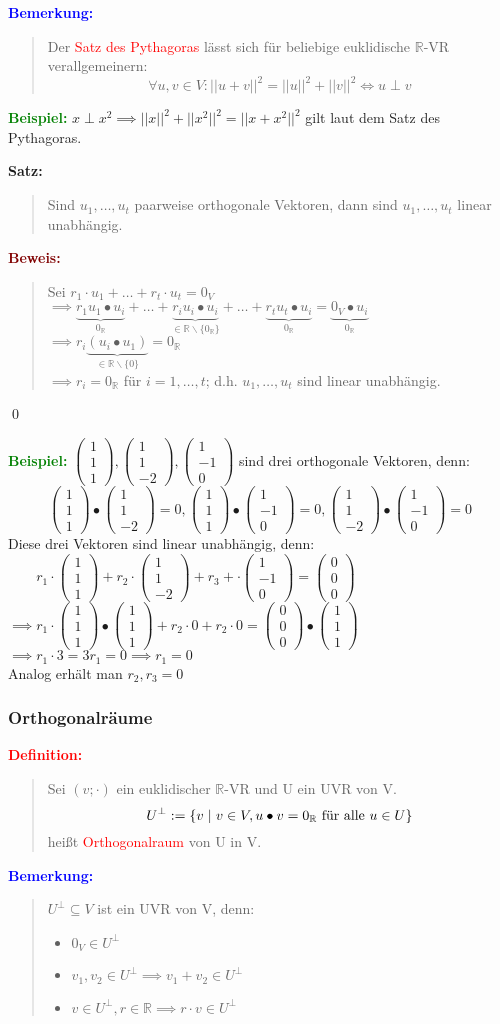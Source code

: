 \documentclass{article}
\newcommand{\smsp}{\phantom{\hspace{3px}}}
\newcommand{\red}[1]{\textcolor{red}{#1}}
\newcommand{\blue}[1]{\textcolor{blue}{#1}}
\newcommand{\green}[1]{\textcolor{green}{#1}}
\newcommand{\dgr}[1]{\textcolor{dgr}{#1}}
\newcommand{\maroon}[1]{\textcolor{maroon}{#1}}
\newcommand{\ex}{\green{\textbf{Beispiel: }}}
\newcommand{\de}[1]{\red{\textbf{Definition: }}\begin{quote}#1\end{quote}}
\newcommand{\an}[1]{\blue{\textbf{Bemerkung: }}\begin{quote}#1\end{quote}}
\newcommand{\se}[1]{\dgr{\textbf{Satz: }}\begin{quote}#1\end{quote}}
\newcommand{\pr}[1]{\maroon{\textbf{Beweis: }}\begin{quote}#1\end{quote}\qed}
\newcommand{\R}{\mathbb{R}}
\renewcommand{\st}{\smsp | \smsp}
\newcommand{\no}[1]{||#1||}
\newcommand{\vvvec}[3]{\begin{pmatrix}#1\\#2\\#3\end{pmatrix}}
\begin{document}
\an{
    Der \red{Satz des Pythagoras} lässt sich für beliebige euklidische $\R$-VR verallgemeinern:
    \[
        \forall u,v \in V: \no{u + v}^2 = \no{u}^2 + \no{v}^2 \iff u \perp v
    \]
}

\ex $x \perp x^2 \implies \no{x}^2 + \no{x^2}^2 = \no{x + x^2}^2$ gilt laut dem Satz des Pythagoras.

\se{
    Sind $u_1, \dots, u_t$ paarweise orthogonale Vektoren, dann sind $u_1, \dots, u_t$ linear unabhängig.
}
\pr{
    Sei $r_1 \cdot u_1 + \dots + r_t \cdot u_t = 0_V$\\
    $\implies \underbrace{r_1u_1 \bullet u_i}_{0_{\R}} + \dots + \underbrace{r_iu_i \bullet u_i}_{\in \R \backslash \{0_{\R}\}} + \dots + \underbrace{r_tu_t \bullet u_i}_{0_{\R}} = \underbrace{0_V \bullet u_i}_{0_{\R}}$\\
    $\implies r_i \underbrace{(u_i \bullet u_1)}_{\in \R \backslash \{0\}} = 0_{\R}$\\
    $\implies r_i = 0_{\R}$ für $i = 1, \dots, t$; d.h. $u_1, \dots, u_t$ sind linear unabhängig.
}

\newpage
\ex $\vvvec{1}{1}{1}, \vvvec{1}{1}{-2}, \vvvec{1}{-1}{0}$ sind drei orthogonale Vektoren, denn:
\[
    \vvvec{1}{1}{1} \bullet \vvvec{1}{1}{-2} = 0, \vvvec{1}{1}{1} \bullet \vvvec{1}{-1}{0} = 0, \vvvec{1}{1}{-2} \bullet \vvvec{1}{-1}{0} = 0
\]
Diese drei Vektoren sind linear unabhängig, denn:\\
$\phantom{\implies} r_1 \cdot \vvvec{1}{1}{1} + r_2 \cdot \vvvec{1}{1}{-2} + r_3 + \cdot \vvvec{1}{-1}{0} = \vvvec{0}{0}{0}$\\
$\implies r_1 \cdot \vvvec{1}{1}{1} \bullet \vvvec{1}{1}{1} + r_2 \cdot 0 + r_2 \cdot 0 = \vvvec{0}{0}{0} \bullet \vvvec{1}{1}{1}$\\
$\implies r_1 \cdot 3 = 3r_1 = 0 \implies r_1 = 0$\\
Analog erhält man $r_2, r_3 = 0$

\subsubsection{Orthogonalräume}

\de{
    Sei $(v; \cdot)$ ein euklidischer $\R$-VR und U ein UVR von V.
    \[
        U^{\perp} := \{v \st v \in V, u \bullet v = 0_{\R} \text{ für alle } u \in U\}
    \]
    heißt \red{Orthogonalraum} von U in V.
}

\an{
    $U^{\perp} \subseteq V$ ist ein UVR von V, denn:
    \begin{itemize}
        \item $0_V \in U^{\perp}$
        \item $v_1, v_2 \in U^{\perp} \implies v_1 + v_2 \in U^{\perp}$
        \item $v \in U^{\perp}, r \in \R \implies r \cdot v \in U^{\perp}$
    \end{itemize}
}
\end{document}
